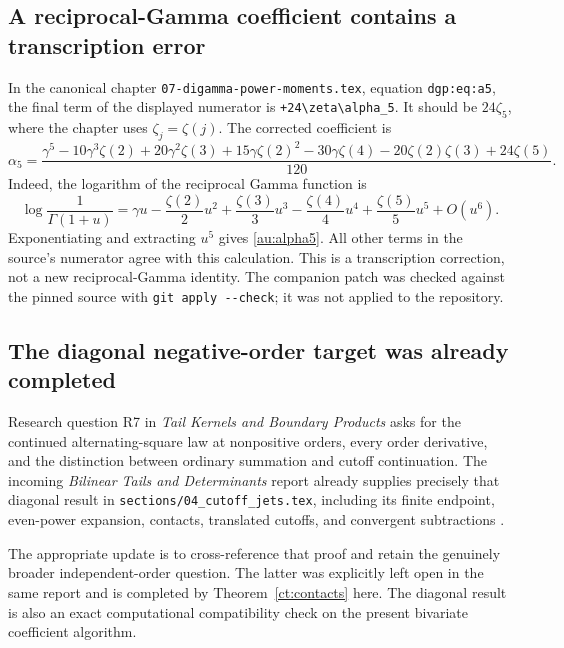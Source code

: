\documentclass[11pt,letterpaper]{article}
\numberwithin{equation}{section}
\theoremstyle{definition}
\theoremstyle{remark}
\newcommand{\src}[1]{\nolinkurl{#1}}
\begin{document}
\subsection{A reciprocal-Gamma coefficient contains a transcription error}

In the canonical chapter
\src{07-digamma-power-moments.tex}, equation
\src{dgp:eq:a5}, the final term of the displayed numerator is
\verb|+24\zeta\alpha_5|.
It should be \(24\zeta_5\), where the chapter uses
\(\zeta_j=\zeta(j)\). The corrected coefficient is
\begin{equation}\label{au:alpha5}
 \boxed{\displaystyle
 \alpha_5=
 \frac{\gamma^5-10\gamma^3\zeta(2)+20\gamma^2\zeta(3)
       +15\gamma\zeta(2)^2-30\gamma\zeta(4)
       -20\zeta(2)\zeta(3)+24\zeta(5)}{120}.}
\end{equation}
Indeed, the logarithm of the reciprocal Gamma function is
\[
 \log\frac1{\Gamma(1+u)}
   =\gamma u-\frac{\zeta(2)}2u^2+\frac{\zeta(3)}3u^3
          -\frac{\zeta(4)}4u^4+\frac{\zeta(5)}5u^5+O(u^6).
\]
Exponentiating and extracting \(u^5\) gives
\eqref{au:alpha5}. All other terms in the source's numerator agree with
this calculation. This is a transcription correction, not a new
reciprocal-Gamma identity. The companion patch was checked against the
pinned source with \src{git apply --check}; it was not applied to the
repository.

\subsection{The diagonal negative-order target was already completed}

Research question R7 in \emph{Tail Kernels and Boundary Products}
\cite{ProveItTailKernels} asks for the continued alternating-square law
at nonpositive orders, every order derivative, and the distinction between
ordinary summation and cutoff continuation. The incoming
\emph{Bilinear Tails and Determinants} report already supplies precisely
that diagonal result in
\src{sections/04_cutoff_jets.tex}, including its finite endpoint,
even-power expansion, contacts, translated cutoffs, and convergent
subtractions \cite{ProveItBilinear}.

The appropriate update is to cross-reference that proof and retain the
genuinely broader independent-order question. The latter was explicitly
left open in the same report and is completed by
Theorem~\ref{ct:contacts} here. The diagonal result is also an exact
computational compatibility check on the present bivariate coefficient
algorithm.
\end{document}
